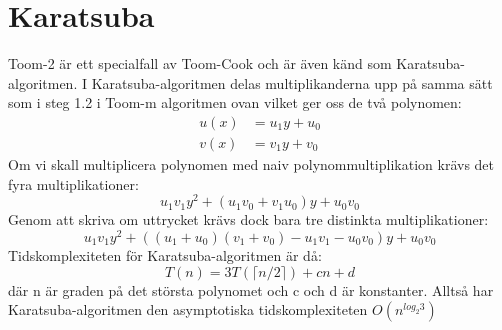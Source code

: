 \section{Karatsuba}
Toom-2 är ett specialfall av Toom-Cook och är även känd som
Karatsuba-algoritmen. I Karatsuba-algoritmen delas multiplikanderna upp på
samma sätt som i steg 1.2 i Toom-m algoritmen ovan vilket ger oss de två
polynomen:
\begin{align*}
  u(x) &= u_1 y + u_0 \\
  v(x) &= v_1 y + v_0
\end{align*}
Om vi skall multiplicera polynomen med naiv polynommultiplikation krävs det
fyra multiplikationer:
\begin{equation*}
  u_1 v_1 y^2 + (u_1 v_0+v_1 u_0) y + u_0 v_0
\end{equation*}
Genom att skriva om uttrycket krävs dock bara tre distinkta multiplikationer:
\begin{equation*}
  u_1 v_1 y^2 + ((u_1 + u_0)(v_1 + v_0) - u_1 v_1 - u_0 v_0) y + u_0 v_0
\end{equation*}
Tidskomplexiteten för Karatsuba-algoritmen är då:
\begin{equation*}
  T(n) = 3 T(\lceil n/2\rceil) + cn + d
\end{equation*}
där n är graden på det största polynomet och c och d är konstanter. Alltså har
Karatsuba-algoritmen den asymptotiska tidskomplexiteten $O(n^{log_2 3})$
